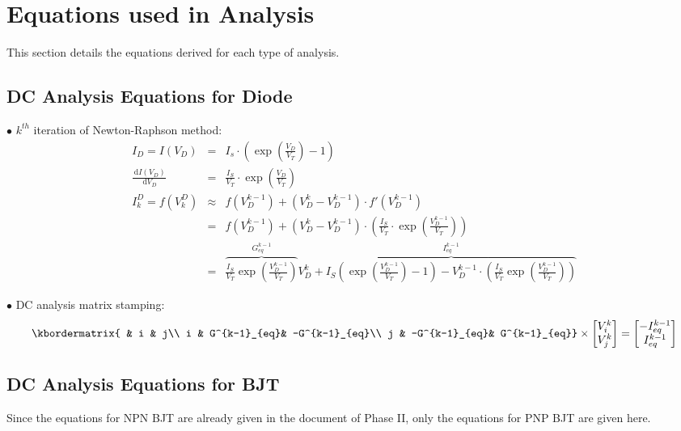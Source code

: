 \documentclass{article}
\begin{document}
\section{Equations used in Analysis}
This section details the equations derived for each type of analysis.

\newcommand{\blline}[1]{\noindent $\bullet$ #1}
\newcommand{\ud}{\,\mathrm{d}}
\newcommand{\NR}{Newton-Raphson}
\newcommand{\Geq}{G^{k-1}_{eq}}
\newcommand{\Ieq}{I^{k-1}_{eq}}
\subsection{DC Analysis Equations for Diode}
$\bullet$ $k^{th}$ iteration of Newton-Raphson method:
\begin{eqnarray*}
  I_D  =  I(V_D) & = & I_s \cdot (\exp(\frac{V_D}{V_T}) -1 ) \\
  \frac{\ud I(V_D) }{\ud V_D} & = & \frac{I_S}{V_T} \cdot \exp(\frac{V_D}{V_T})\\
  I^D_k = f(V^D_k) & \approx &f(V^{k-1}_D) + (V^k_D - V^{k-1}_D) \cdot f'(V^{k-1}_D)\\
  & = & f(V^{k-1}_D) + (V^k_D - V^{k-1}_D) \cdot (\frac{I_S}{V_T} \cdot \exp(\frac{V^{k-1}_D}{V_T}))\\
  & = & \overbrace{\frac{I_S}{V_T} \exp(\frac{V^{k-1}_D}{V_T})}^{\Geq} V^k_D
  + \overbrace{I_S (\exp (\frac{V^{k-1}_D}{V_T}) - 1) 
  - V^{k-1}_D \cdot (\frac{I_S}{V_T}\exp(\frac{V^{k-1}_D}{V_T}))}^{\Ieq}
\end{eqnarray*}

\noindent $\bullet$ DC analysis matrix stamping:
\begin{equation*}
  \kbordermatrix{
     & i     & j\\
   i & \Geq  & -\Geq \\
   j & -\Geq &  \Geq }
  \times
  \begin{bmatrix}
    V^k_i \\
    V^k_j 
  \end{bmatrix}  = 
  \begin{bmatrix}
    -\Ieq\\
    \Ieq
  \end{bmatrix}
\end{equation*}

\subsection{DC Analysis Equations for BJT}
Since the equations for NPN BJT are already given in the document of
Phase II, only the equations for PNP BJT are given here.
\end{document}
